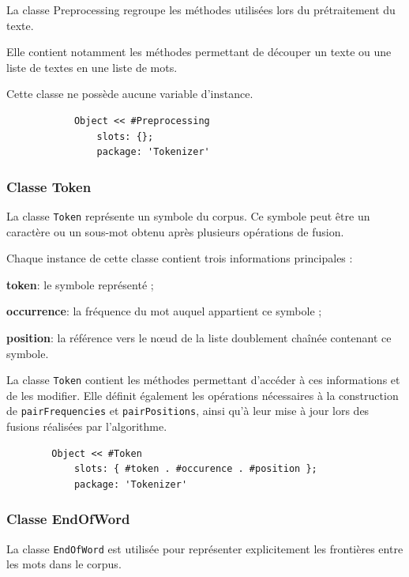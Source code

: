 \documentclass[12pt,a4paper]{report}
\begin{document}
		La classe Preprocessing regroupe les méthodes utilisées lors du prétraitement du texte.
		
		Elle contient notamment les méthodes permettant de découper un texte ou une liste de textes en une liste de mots.
		
		Cette classe ne possède aucune variable d’instance.
		
		\begin{verbatim}
			Object << #Preprocessing	
				slots: {};	
				package: 'Tokenizer'
		\end{verbatim}
		
	\subsubsection{Classe Token}
	
	La classe \texttt{Token} représente un symbole du corpus. Ce symbole peut être un caractère ou un sous-mot obtenu après plusieurs opérations de fusion.
	
	Chaque instance de cette classe contient trois informations principales :
	\begin{itemizeFB}
		\item \textbf{token}: le symbole représenté ;
		
		\item \textbf{occurrence}: la fréquence du mot auquel appartient ce symbole ;
		
		\item \textbf{position}: la référence vers le nœud de la liste doublement chaînée contenant ce symbole.
	\end{itemizeFB}
	
	La classe \texttt{Token} contient les méthodes permettant d’accéder à ces informations et de les modifier. Elle définit également les opérations nécessaires à la construction de \texttt{pairFrequencies} et \texttt{pairPositions}, ainsi qu’à leur mise à jour lors des fusions réalisées par l’algorithme.
	
	\begin{verbatim}
		Object << #Token	
			slots: { #token . #occurence . #position };	
			package: 'Tokenizer'
	\end{verbatim}
	
	\subsubsection{Classe EndOfWord}
	
	La classe \texttt{EndOfWord} est utilisée pour représenter explicitement les frontières entre les mots dans le corpus.
	
\end{document}
